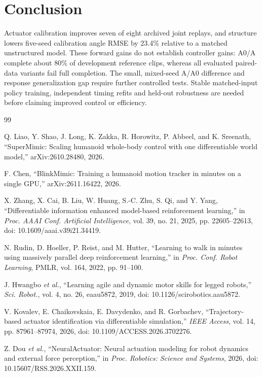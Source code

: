 \documentclass[letterpaper,10pt,conference]{ieeeconf}
\begin{document}
\section{Conclusion}
Actuator calibration improves seven of eight archived joint replays, and structure lowers five-seed calibration angle RMSE by 23.4\% relative to a matched unstructured model. These forward gains do not establish controller gains: A0/A complete about 80\% of development reference clips, whereas all evaluated paired-data variants fail full completion. The small, mixed-seed A/A0 difference and response generalization gap require further controlled tests. Stable matched-input policy training, independent timing refits and held-out robustness are needed before claiming improved control or efficiency.

\begin{thebibliography}{99}

Q. Liao, Y. Shao, J. Long, K. Zakka, R. Horowitz, P. Abbeel, and K. Sreenath, ``SuperMimic: Scaling humanoid whole-body control with one differentiable world model,'' arXiv:2610.28480, 2026.

F. Chen, ``BlinkMimic: Training a humanoid motion tracker in minutes on a single GPU,'' arXiv:2611.16422, 2026.

X. Zhang, X. Cai, B. Liu, W. Huang, S.-C. Zhu, S. Qi, and Y. Yang, ``Differentiable information enhanced model-based reinforcement learning,'' in \emph{Proc. AAAI Conf. Artificial Intelligence}, vol. 39, no. 21, 2025, pp. 22605--22613, doi: 10.1609/aaai.v39i21.34419.

N. Rudin, D. Hoeller, P. Reist, and M. Hutter, ``Learning to walk in minutes using massively parallel deep reinforcement learning,'' in \emph{Proc. Conf. Robot Learning}, PMLR, vol. 164, 2022, pp. 91--100.

J. Hwangbo \emph{et al.}, \textquotedblleft Learning agile and dynamic motor skills for legged robots,\textquotedblright{} \emph{Sci. Robot.}, vol. 4, no. 26, eaau5872, 2019, doi: 10.1126/scirobotics.aau5872.

V. Kovalev, E. Chaikovskaia, E. Davydenko, and R. Gorbachev, \textquotedblleft Trajectory-based actuator identification via differentiable simulation,\textquotedblright{} \emph{IEEE Access}, vol. 14, pp. 87961--87974, 2026, doi: 10.1109/ACCESS.2026.3702276.

Z. Dou \emph{et al.}, \textquotedblleft NeuralActuator: Neural actuation modeling for robot dynamics and external force perception,\textquotedblright{} in \emph{Proc. Robotics: Science and Systems}, 2026, doi: 10.15607/RSS.2026.XXII.159.


\end{thebibliography}
\end{document}

